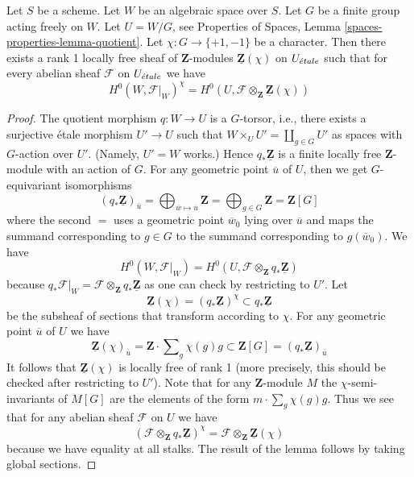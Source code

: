 \begin{lemma}
\label{lemma-twist}
Let $S$ be a scheme. Let $W$ be an algebraic space over $S$.
Let $G$ be a finite group acting freely on $W$.
Let $U = W/G$, see
Properties of Spaces, Lemma \ref{spaces-properties-lemma-quotient}.
Let $\chi : G \to \{+1, -1\}$ be a character.
Then there exists a rank 1 locally free sheaf of $\mathbf{Z}$-modules
$\underline{\mathbf{Z}}(\chi)$ on $U_{\acute{e}tale}$ such that for every
abelian sheaf $\mathcal{F}$ on $U_{\acute{e}tale}$ we have
$$
H^0(W, \mathcal{F}|_W)^\chi =
H^0(U, \mathcal{F} \otimes_{\mathbf{Z}} \underline{\mathbf{Z}}(\chi))
$$
\end{lemma}

\begin{proof}
The quotient morphism $q : W \to U$ is a $G$-torsor, i.e., there exists
a surjective \'etale morphism $U' \to U$ such that
$W \times_U U' = \coprod_{g \in G} U'$ as spaces with $G$-action over $U'$.
(Namely, $U' = W$ works.) Hence $q_*\underline{\mathbf{Z}}$ is a finite
locally free $\mathbf{Z}$-module with an action of $G$. For any
geometric point $\overline{u}$ of $U$, then we get $G$-equivariant
isomorphisms
$$
(q_*\underline{\mathbf{Z}})_{\overline{u}}
= \bigoplus\nolimits_{\overline{w} \mapsto \overline{u}} \mathbf{Z}
= \bigoplus\nolimits_{g \in G} \mathbf{Z} = \mathbf{Z}[G]
$$
where the second $=$ uses a geometric point
$\overline{w}_0$ lying over $\overline{u}$ and
maps the summand corresponding to $g \in G$ to the summand
corresponding to $g(\overline{w}_0)$. We have
$$
H^0(W, \mathcal{F}|_W) =
H^0(U, \mathcal{F} \otimes_\mathbf{Z} q_*\underline{\mathbf{Z}})
$$
because
$q_*\mathcal{F}|_W = \mathcal{F} \otimes_\mathbf{Z} q_*\underline{\mathbf{Z}}$
as one can check by restricting to $U'$. Let
$$
\underline{\mathbf{Z}}(\chi) =
(q_*\underline{\mathbf{Z}})^\chi \subset
q_*\underline{\mathbf{Z}}
$$
be the subsheaf of sections that transform according to $\chi$. For
any geometric point $\overline{u}$ of $U$ we have
$$
\underline{\mathbf{Z}}(\chi)_{\overline{u}} =
\mathbf{Z} \cdot \sum\nolimits_g \chi(g) g
\subset
\mathbf{Z}[G] = (q_*\underline{\mathbf{Z}})_{\overline{u}}
$$
It follows that $\underline{\mathbf{Z}}(\chi)$ is locally free of
rank 1 (more precisely, this should be checked after restricting to $U'$).
Note that for any $\mathbf{Z}$-module $M$ the $\chi$-semi-invariants
of $M[G]$ are the elements of the form $m \cdot \sum\nolimits_g \chi(g) g$.
Thus we see that for any abelian sheaf $\mathcal{F}$ on $U$ we have
$$
\left(\mathcal{F} \otimes_\mathbf{Z} q_*\underline{\mathbf{Z}}\right)^\chi
=
\mathcal{F} \otimes_\mathbf{Z} \underline{\mathbf{Z}}(\chi)
$$
because we have equality at all stalks. The result of the lemma follows by
taking global sections.
\end{proof}

